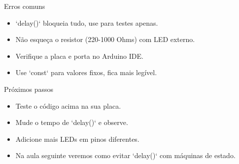\documentclass[10pt]{beamer}
\begin{document}
\begin{frame}{Erros comuns}
  \begin{itemize}
    \item `delay()` bloqueia tudo, use para testes apenas.
    \item Não esqueça o resistor (220-1000 Ohms) com LED externo.
    \item Verifique a placa e porta no Arduino IDE.
    \item Use `const` para valores fixos, fica mais legível.
  \end{itemize}
\end{frame}

\begin{frame}{Próximos passos}
  \begin{itemize}
    \item Teste o código acima na sua placa.
    \item Mude o tempo de `delay()` e observe.
    \item Adicione mais LEDs em pinos diferentes.
    \item Na aula seguinte veremos como evitar `delay()` com máquinas de estado.
  \end{itemize}
\end{frame}
\end{document}

